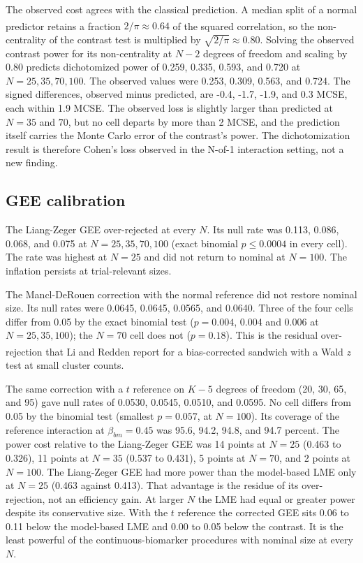 \documentclass[
  11pt,
]{article}
\begin{document}
The observed cost agrees with the classical prediction. A median
split of a normal predictor retains a fraction \(2/\pi \approx 0.64\)
of the squared correlation\textsuperscript{}, so the
non-centrality of the contrast test is multiplied by
\(\sqrt{2/\pi} \approx 0.80\). Solving the observed contrast power
for its non-centrality at \(N - 2\) degrees of freedom and scaling by
0.80 predicts dichotomized power of 0.259, 0.335, 0.593, and 0.720 at
\(N = 25, 35, 70, 100\). The observed values were 0.253, 0.309, 0.563, and 0.724.
The signed differences, observed minus predicted, are
-0.4, -1.7, -1.9, and 0.3 MCSE, each within
1.9 MCSE. The observed loss is slightly
larger than predicted at \(N = 35\) and \(70\), but no cell departs by
more than 2 MCSE, and the prediction itself carries the Monte Carlo
error of the contrast's power. The dichotomization result is
therefore Cohen's loss observed in the N-of-1 interaction setting,
not a new finding.

\subsection{GEE calibration}\label{gee-calibration}

The Liang-Zeger GEE over-rejected at every \(N\). Its null rate was
0.113, 0.086, 0.068, and 0.075 at \(N = 25, 35, 70, 100\) (exact binomial
\(p \le 0.0004\) in every cell). The rate was
highest at \(N = 25\) and did not return to nominal at \(N = 100\). The
inflation persists at trial-relevant sizes.

The Mancl-DeRouen correction with the normal reference did not
restore nominal size. Its null rates were
0.0645, 0.0645, 0.0565, and 0.0640. Three of the four cells
differ from 0.05 by the exact binomial test
(\(p = 0.004\),
0.004 and
0.006 at \(N = 25, 35, 100\)); the
\(N = 70\) cell does not (\(p = 0.18\)).
This is the residual over-rejection that Li and Redden\textsuperscript{} report for
a bias-corrected sandwich with a Wald \(z\) test at small cluster
counts.

The same correction with a \(t\) reference on \(K - 5\) degrees of
freedom (20, 30, 65, and 95) gave null rates of
0.0530, 0.0545, 0.0510, and 0.0595. No cell differs from 0.05 by
the binomial test (smallest
\(p = 0.057\), at
\(N = 100\)). Its coverage of the
reference interaction at \(\beta_{bm} = 0.45\) was
95.6, 94.2, 94.8, and 94.7 percent. The power cost
relative to the Liang-Zeger GEE was
14 points at \(N = 25\)
(0.463 to 0.326),
11 points at \(N = 35\)
(0.537 to 0.431),
5 points at \(N = 70\),
and 2 points at
\(N = 100\). The Liang-Zeger GEE had more power than the model-based
LME only at \(N = 25\) (0.463 against
0.413). That advantage is the residue of its
over-rejection, not an efficiency gain. At larger \(N\) the LME had
equal or greater power despite its conservative size. With the \(t\)
reference the corrected GEE sits
0.06 to 0.11 below the model-based LME
and 0.00 to 0.05 below the
contrast. It is the least powerful of the continuous-biomarker
procedures with nominal size at every \(N\).
\end{document}
